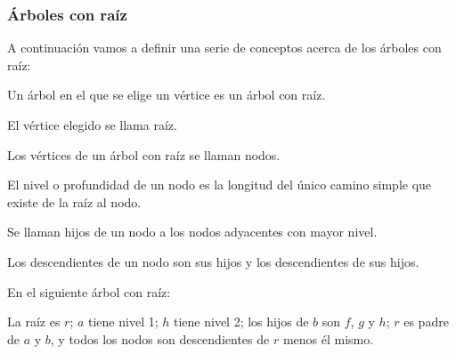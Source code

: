\subsubsection{Árboles con raíz}
A continuación vamos a definir una serie de conceptos acerca de los árboles con raíz:
\begin{ndef}
    Un árbol en el que se elige un vértice es un árbol con raíz.
\end{ndef}
\begin{ndef}[Raíz]
    El vértice elegido se llama raíz.
\end{ndef}
\begin{ndef}[Nodo]
    Los vértices de un árbol con raíz se llaman nodos.
\end{ndef}
\begin{ndef}[Nivel]
    El nivel o profundidad de un nodo es la longitud del único camino simple que existe de la raíz al nodo.
\end{ndef}
\begin{ndef}[Hijo]
    Se llaman hijos de un nodo a los nodos adyacentes con mayor nivel.
\end{ndef}
\begin{ndef}[Descendiente]
    Los descendientes de un nodo son sus hijos y los descendientes de sus hijos.
\end{ndef}
\begin{ejemplo} En el siguiente árbol con raíz:
    \begin{center}
    \end{center}
    La raíz es $r$; $a$ tiene nivel 1; $h$ tiene nivel 2; los hijos de $b$ son $f$, $g$ y $h$; $r$ es padre de $a$ y $b$, y todos los nodos son descendientes de $r$ menos él mismo.
\end{ejemplo}

